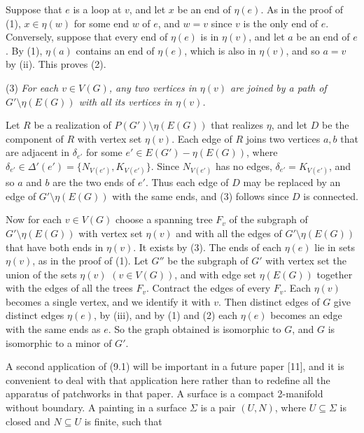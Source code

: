{Suppose that $e$ is a loop at $v$, and let $x$ be an end of $\eta(e)$. As in the proof of (1),
$x \in \eta(w)$ for some end $w$ of $e$, and $w = v$ since $v$ is the only end of $e$. Conversely,
suppose that every end of $\eta(e)$ is in $\eta(v)$, and let $a$ be an end of $e$. By (1),
$\eta(a)$ contains an end of $\eta(e)$, which is also in $\eta(v)$, and so $a = v$ by (ii). This
proves (2).

\hspace*{12pt}(3) \textit{For each $v \in V(G)$, any two vertices in $\eta(v)$ are joined by a path
of $G' \setminus \eta(E(G))$ with all its vertices in $\eta(v)$.}

Let $R$ be a realization of $P(G') \setminus \eta(E(G))$ that realizes $\eta$, and let $D$ be the
component of $R$ with vertex set $\eta(v)$. Each edge of $R$ joins two vertices $a, b$ that are
adjacent in $\delta_{e'}$ for some $e' \in E(G') - \eta(E(G))$, where
$\delta_{e'} \in \Delta'(e') = \{N_{V(e')}, K_{V(e')}\}$. Since $N_{V(e')}$ has no edges,
$\delta_{e'} = K_{V(e')}$, and so $a$ and $b$ are the two ends of $e'$. Thus each edge of $D$ may be
replaced by an edge of $G' \setminus \eta(E(G))$ with the same ends, and (3) follows since $D$ is
connected.

Now for each $v \in V(G)$ choose a spanning tree $F_v$ of the subgraph of
$G' \setminus \eta(E(G))$ with vertex set $\eta(v)$ and with all the edges of
$G' \setminus \eta(E(G))$ that have both ends in $\eta(v)$. It exists by (3). The ends of each
$\eta(e)$ lie in sets $\eta(v)$, as in the proof of (1). Let $G''$ be the subgraph of $G'$ with
vertex set the union of the sets $\eta(v)$ $(v \in V(G))$, and with edge set $\eta(E(G))$ together
with the edges of all the trees $F_v$. Contract the edges of every $F_v$. Each $\eta(v)$ becomes a
single vertex, and we identify it with $v$. Then distinct edges of $G$ give distinct edges $\eta(e)$,
by (iii), and by (1) and (2) each $\eta(e)$ becomes an edge with the same ends as $e$. So the graph
obtained is isomorphic to $G$, and $G$ is isomorphic to a minor of
$G'$.}

A second application of (9.1) will be important in a future paper [11], and it is convenient to deal with that application here rather than to redefine all the apparatus of patchworks in that paper. A surface is a compact 2-manifold without boundary. A painting in a surface $\Sigma$ is a pair $(U, N)$, where $U \subseteq \Sigma$ is closed and $N \subseteq U$ is finite, such that

